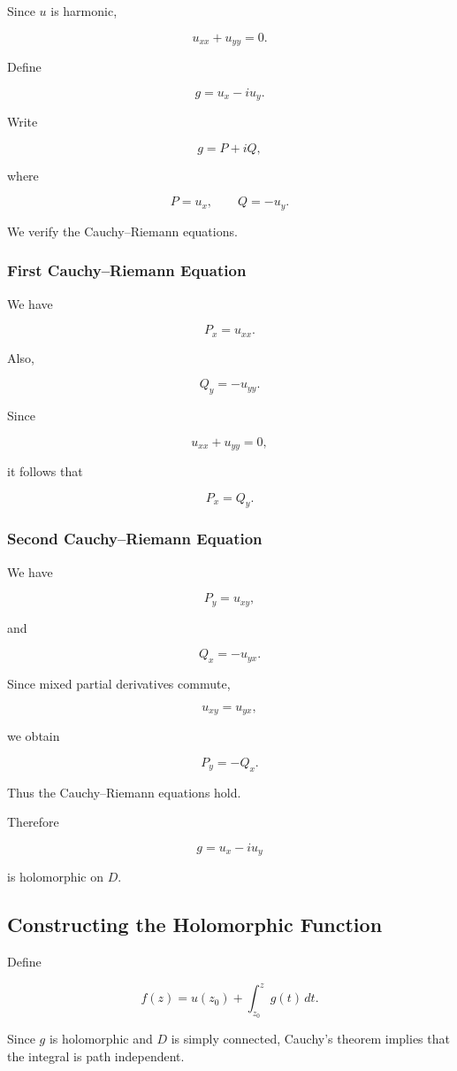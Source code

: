 \documentclass[12pt,a4paper]{article}
\theoremstyle{notespace}
\begin{document}
Since \(u\) is harmonic,

\[
u_{xx}+u_{yy}=0.
\]

Define

\[
g=u_x-i u_y.
\]

Write

\[
g=P+iQ,
\]

where

\[
P=u_x,
\qquad
Q=-u_y.
\]

We verify the Cauchy--Riemann equations.

\subsubsection*{First Cauchy--Riemann Equation}

We have

\[
P_x=u_{xx}.
\]

Also,

\[
Q_y=-u_{yy}.
\]

Since

\[
u_{xx}+u_{yy}=0,
\]

it follows that

\[
P_x=Q_y.
\]

\subsubsection*{Second Cauchy--Riemann Equation}

We have

\[
P_y=u_{xy},
\]

and

\[
Q_x=-u_{yx}.
\]

Since mixed partial derivatives commute,

\[
u_{xy}=u_{yx},
\]

we obtain

\[
P_y=-Q_x.
\]

Thus the Cauchy--Riemann equations hold.

Therefore

\[
\boxed{
	g=u_x-i u_y
}
\]

is holomorphic on \(D\).

\subsection*{Constructing the Holomorphic Function}

Define

\[
f(z)
=
u(z_0)
+
\int_{z_0}^{z}
g(t)\,dt.
\]

Since \(g\) is holomorphic and \(D\) is simply connected, Cauchy's theorem implies that the integral is path independent.
\end{document}

